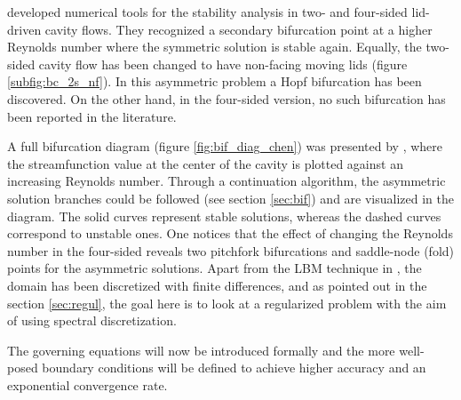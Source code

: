 \cite{cadou2012} developed numerical tools for the stability analysis in two-
and four-sided lid-driven cavity flows. They recognized a secondary bifurcation
point at a higher Reynolds number where the symmetric solution is stable again.
Equally, the two-sided cavity flow has been changed to have non-facing moving
lids (figure \ref{subfig:bc_2s_nf}). In this asymmetric problem a Hopf
bifurcation has been discovered. On the other hand, in the four-sided version,
no such bifurcation has been reported in the literature.

A full bifurcation diagram (figure \ref{fig:bif_diag_chen}) was presented by
\cite{chen2013}, where the streamfunction value at the center of the cavity is
plotted against an increasing Reynolds number. Through a continuation
algorithm, the asymmetric solution branches could be followed (see section
\ref{sec:bif}) and are visualized in the diagram. The solid curves represent
stable solutions, whereas the dashed curves correspond to unstable ones. One
notices that the effect of changing the Reynolds number in the four-sided
reveals two pitchfork bifurcations and saddle-node (fold) points for the
asymmetric solutions. Apart from the LBM technique in \citet{chen2013}, the
domain has been discretized with finite differences, and as pointed out in the
section \ref{sec:regul}, the goal here is to look at a regularized problem with
the aim of using spectral discretization.

The governing equations will now be introduced formally and the more well-posed
boundary conditions will be defined to achieve higher accuracy and an
exponential convergence rate.
